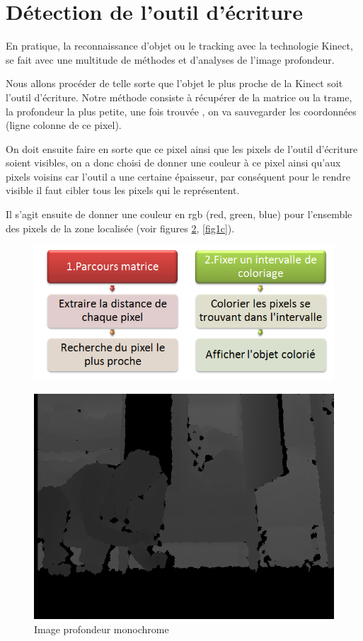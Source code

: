 \documentclass[12pt,a4paper,oneside]{book}
\begin{document}
	\section{Détection de l'outil d'écriture}
	En pratique, la reconnaissance d'objet ou le tracking avec la technologie Kinect, se fait avec une multitude de méthodes et d'analyses de l'image profondeur.
	
	Nous allons procéder de telle sorte que l'objet le plus proche de la Kinect soit l'outil d'écriture.
	Notre méthode consiste à récupérer de la matrice ou la trame, la profondeur la plus petite,  une fois  trouvée , on va sauvegarder les coordonnées (ligne colonne de ce pixel).
	
	On doit ensuite faire en sorte que ce pixel ainsi que les pixels de l'outil d'écriture soient visibles, on a donc choisi de donner une couleur à ce pixel ainsi qu'aux pixels voisins car l'outil a une certaine épaisseur, par conséquent pour le rendre visible il faut cibler tous les pixels qui le représentent.
	
	Il s'agit ensuite de donner une couleur en rgb (red, green, blue) pour l'ensemble des pixels de la zone localisée (voir figures \ref{fig1i}, \ref{fig1c}).
	
	\begin{figure}[H]
		\centering
		\includegraphics[scale=0.75]{s2.png}
		
		\label{fig}
	\end{figure}
	
	\begin{figure}[H]
		\centering
		\includegraphics[scale=0.5]{image2.png}
		\caption{Image profondeur monochrome}
		\label{fig1i}
	\end{figure}
	
\end{document}
